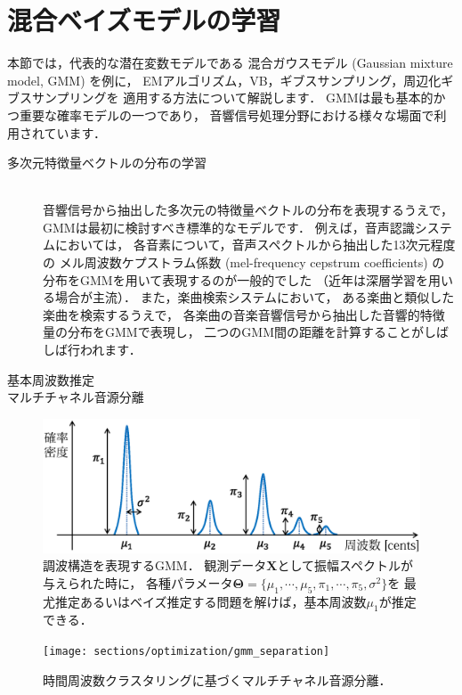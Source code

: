 \section{混合ベイズモデルの学習}

本節では，代表的な潜在変数モデルである
混合ガウスモデル (Gaussian mixture model, GMM) を例に，
EMアルゴリズム，VB，ギブスサンプリング，周辺化ギブスサンプリングを
適用する方法について解説します．
GMMは最も基本的かつ重要な確率モデルの一つであり，
音響信号処理分野における様々な場面で利用されています．
\begin{description}
\item[多次元特徴量ベクトルの分布の学習] \ \\
音響信号から抽出した多次元の特徴量ベクトルの分布を表現するうえで，
GMMは最初に検討すべき標準的なモデルです．
例えば，音声認識システムにおいては，
各音素について，音声スペクトルから抽出した13次元程度の
メル周波数ケプストラム係数 (mel-frequency cepstrum coefficients)
の分布をGMMを用いて表現するのが一般的でした
（近年は深層学習を用いる場合が主流）\cite{speech_recognition}．
また，楽曲検索システムにおいて，
ある楽曲と類似した楽曲を検索するうえで，
各楽曲の音楽音響信号から抽出した音響的特徴量の分布をGMMで表現し，
二つのGMM間の距離を計算することがしばしば行われます\cite{music_retrieval}．
\item[基本周波数推定]
\item[マルチチャネル音源分離]
\end{description}

\begin{figure}[t]
\centering
\includegraphics[width=.9\linewidth]{sections/optimization/gmm_f0_estimation}
\vspace{-2mm}
\caption{調波構造を表現するGMM．
観測データ$\bm{X}$として振幅スペクトルが与えられた時に，
各種パラメータ$\bm\Theta=\{\mu_1,\cdots,\mu_5,\pi_1,\cdots,\pi_5,\sigma^2\}$を
最尤推定あるいはベイズ推定する問題を解けば，基本周波数$\mu_1$が推定できる．}
\label{fig:gmm_f0_estimation}
\end{figure}

\begin{figure}[t]
\centering
\texttt{[image: sections/optimization/gmm\_separation]}
\vspace{-2mm}
\caption{時間周波数クラスタリングに基づくマルチチャネル音源分離．}
\label{fig:gmm_separation}
\end{figure}



